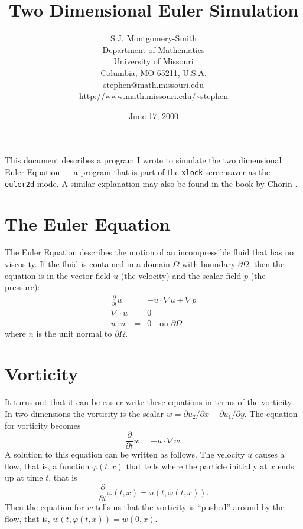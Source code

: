 \documentclass[12pt]{article}
\begin{document}
\title{Two Dimensional Euler Simulation}

\author{
S.J. Montgomery-Smith\\
Department of Mathematics\\
University of Missouri\\
Columbia, MO 65211, U.S.A.\\
stephen@math.missouri.edu\\
http://www.math.missouri.edu/\~{}stephen}

\date{June 17, 2000}

\maketitle

This document describes a program I wrote to simulate the 
two dimensional Euler Equation --- a program that is part
of the {\tt xlock} screensaver as the {\tt euler2d}
mode.  A similar explanation may also be found in the
book by Chorin \cite{C}.

\section{The Euler Equation}

The Euler Equation describes the motion of an incompressible
fluid that has no viscosity.  If the fluid is contained
in a domain $\Omega$ with boundary $\partial \Omega$, then
the equation is in the vector field $u$ (the velocity)
and the
scalar field $p$ (the pressure):
\begin{eqnarray*}
\frac{\partial}{\partial t} u &=& -u \cdot \nabla u + \nabla p \\
\nabla \cdot u &=& 0 \\
u \cdot n &=& 0 \quad \text{on $\partial \Omega$}
\end{eqnarray*}
where $n$ is the unit normal to $\partial \Omega$.

\section{Vorticity}

It turns out that it can be easier write these equations
in terms of the vorticity.  In two dimensions the vorticity
is the scalar $w = \partial u_2/\partial x - \partial u_1/\partial y$.
The equation for vorticity becomes
\[ \frac{\partial}{\partial t} w = -u \cdot \nabla w .\]
A solution to this equation can be written as follows.  The velocity
$u$ causes a flow, that is, a function $\varphi(t,x)$ that tells where
the particle initially at $x$ ends up at time $t$, that is
\[
\frac\partial{\partial t} \varphi(t,x)
= u(t,\varphi(t,x)) .\]
Then the equation
for $w$ tells us that the vorticity is ``pushed'' around by the flow,
that is, $w(t,\varphi(t,x)) = w(0,x)$.
\end{document}
